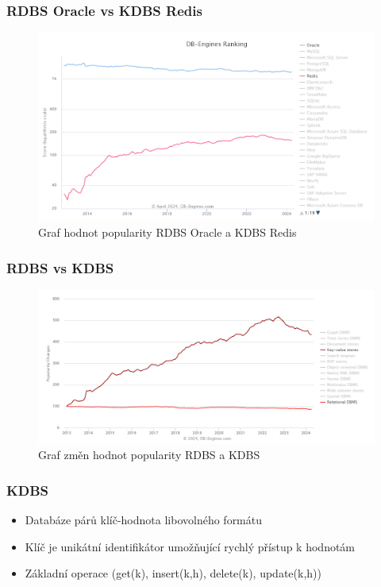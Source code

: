 \documentclass{beamer}
\begin{document}
	\begin{frame}
		\frametitle{RDBS Oracle vs KDBS Redis}
		\begin{figure}
			\centering
			\includegraphics[scale=0.4]{Figures/db-engine-trend-dbs.PNG}
			\caption{Graf hodnot popularity RDBS Oracle a KDBS Redis~\cite{dbranking-trend-by-dbs}\label{graf-dbranking-trend-dbs}}
		\end{figure}
	\end{frame}
	
	\begin{frame}
		\frametitle{RDBS vs KDBS}
		\begin{figure}
			\centering
			\includegraphics[scale=0.4]{Figures/db-engine-trend-model.PNG}
			\caption{Graf změn hodnot popularity RDBS a KDBS~\cite{dbranking-trend-by-model}}
		\end{figure}
	\end{frame}
	
	\begin{frame}
		\frametitle{KDBS}
		\begin{itemize}
			\item Databáze párů klíč-hodnota libovolného formátu
			\item Klíč je unikátní identifikátor umožňující rychlý přístup k hodnotám
			\item Základní operace (get(k), insert(k,h), delete(k), update(k,h))~\cite{vsb-nerelacni-db}
		\end{itemize}	
	\end{frame}
	
\end{document}
